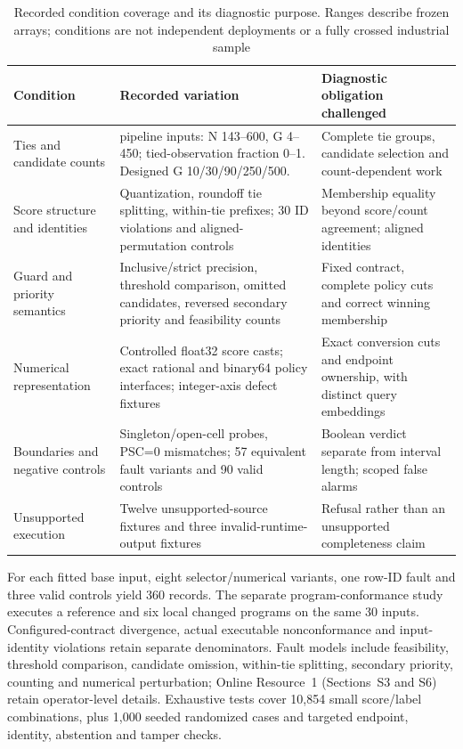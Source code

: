 \documentclass[11pt,a4paper]{article}
\begin{document}
\begin{table}[!htbp]
\caption{Recorded condition coverage and its diagnostic purpose. Ranges describe frozen arrays; conditions are not independent deployments or a fully crossed industrial sample}\label{tab:4}
\centering
\footnotesize
\setlength{\tabcolsep}{3.5pt}
\renewcommand{\arraystretch}{1.15}
\begin{tabularx}{\textwidth}{@{} >{\raggedright\arraybackslash}p{2.8cm} >{\raggedright\arraybackslash}X >{\raggedright\arraybackslash}X @{}}
\toprule
\textbf{Condition} & \textbf{Recorded variation} & \textbf{Diagnostic obligation challenged} \\
\midrule
Ties and candidate counts & 30 pipeline inputs: N 143--600, G 4--450; tied-observation fraction 0--1. Designed G 10/30/90/250/500. & Complete tie groups, candidate selection and count-dependent work \\
Score structure and identities & Quantization, roundoff tie splitting, within-tie prefixes; 30 ID violations and aligned-permutation controls & Membership equality beyond score/count agreement; aligned identities \\
Guard and priority semantics & Inclusive/strict precision, threshold comparison, omitted candidates, reversed secondary priority and feasibility counts & Fixed contract, complete policy cuts and correct winning membership \\
Numerical representation & Controlled float32 score casts; exact rational and binary64 policy interfaces; integer-axis defect fixtures & Exact conversion cuts and endpoint ownership, with distinct query embeddings \\
Boundaries and negative controls & Singleton/open-cell probes, PSC=0 mismatches; 57 equivalent fault variants and 90 valid controls & Boolean verdict separate from interval length; scoped false alarms \\
Unsupported execution & Twelve unsupported-source fixtures and three invalid-runtime-output fixtures & Refusal rather than an unsupported completeness claim \\
\bottomrule
\end{tabularx}
\end{table}
\FloatBarrier

For each fitted base input, eight selector/numerical variants, one row-ID fault and three valid controls yield 360 records. The separate program-conformance study executes a reference and six local changed programs on the same 30 inputs. Configured-contract divergence, actual executable nonconformance and input-identity violations retain separate denominators. Fault models include feasibility, threshold comparison, candidate omission, within-tie splitting, secondary priority, counting and numerical perturbation; Online Resource~1 (Sections~S3 and S6) retain operator-level details. Exhaustive tests cover 10{,}854 small score/label combinations, plus 1{,}000 seeded randomized cases and targeted endpoint, identity, abstention and tamper checks.
\end{document}
